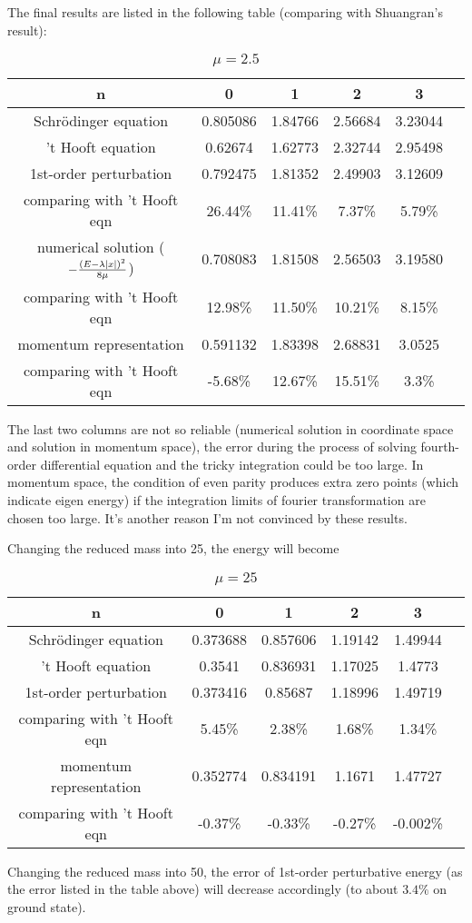 \documentclass{article}
\begin{document}
The final results are listed in the following table (comparing with Shuangran's result):
\begin{table}[H]
  \centering
  \begin{tabular}{|c|c|c|c|c|c|}
    \hline
    n & 0 & 1 & 2 & 3 \\\hline
    Schr\"odinger equation&0.805086&1.84766&2.56684&3.23044\\\hline
    't Hooft equation& 0.62674 & 1.62773 & 2.32744 & 2.95498 \\\hline
    1st-order perturbation&0.792475&1.81352&2.49903&3.12609\\\hline
    {\color{red}{error}} comparing with 't Hooft eqn&26.44\%&11.41\%&7.37\%&5.79\%\\\hline
    numerical solution ($-\frac{(E-\lambda\abs{x})^2}{8\mu}$)&0.708083 &1.81508&2.56503 &3.19580\\\hline
    {\color{red}{error}} comparing with 't Hooft eqn&12.98\%&11.50\%&10.21\%&8.15\%\\\hline
    momentum representation &0.591132&1.83398&2.68831&3.0525\\\hline
    {\color{red}{error}} comparing with 't Hooft eqn&-5.68\%&12.67\%&15.51\%&3.3\%\\\hline
  \end{tabular}
  \caption{$\mu=2.5$}
\end{table}

The last two columns are not so reliable (numerical solution in coordinate space and solution in momentum space), the error during the process of solving fourth-order differential equation and the tricky integration could be too large. In momentum space, the condition of even parity produces extra zero points (which indicate eigen energy) if the integration limits of fourier transformation are chosen too large. It's another reason I'm not convinced by these results.

Changing the reduced mass into 25, the energy will become
\begin{table}[H]
  \centering
  \begin{tabular}{|c|c|c|c|c|c|}
   \hline
   n & 0 & 1 & 2 & 3 \\\hline
   Schr\"odinger equation&0.373688& 0.857606& 1.19142& 1.49944\\\hline
   't Hooft equation& 0.3541& 0.836931& 1.17025&1.4773 \\\hline
   1st-order perturbation&0.373416&0.85687& 1.18996& 1.49719\\\hline
   {\color{red}{error}} comparing with 't Hooft eqn&5.45\%&2.38\%&1.68\%&1.34\%\\\hline
   momentum representation &0.352774&0.834191&1.1671&1.47727\\\hline
   {\color{red}{error}} comparing with 't Hooft eqn&-0.37\%&-0.33\%&-0.27\%&-0.002\%\\\hline
  \end{tabular}
  \caption{$\mu=25$}
\end{table}

Changing the reduced mass into 50, the error of 1st-order perturbative energy (as the error listed in the table above) will decrease accordingly (to about $3.4\%$ on ground state).
\end{document}
